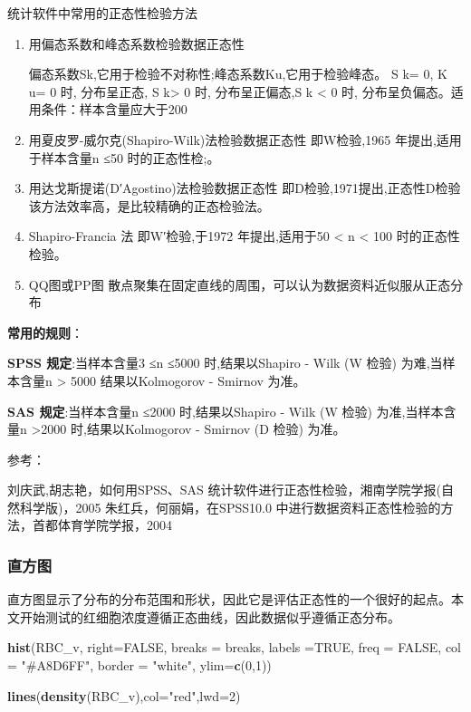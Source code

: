 \documentclass[
]{article}
\newenvironment{Shaded}{\begin{snugshade}}{\end{snugshade}}
\newcommand{\DataTypeTok}[1]{\textcolor[rgb]{0.13,0.29,0.53}{#1}}
\newcommand{\DecValTok}[1]{\textcolor[rgb]{0.00,0.00,0.81}{#1}}
\newcommand{\KeywordTok}[1]{\textcolor[rgb]{0.13,0.29,0.53}{\textbf{#1}}}
\newcommand{\NormalTok}[1]{#1}
\newcommand{\OtherTok}[1]{\textcolor[rgb]{0.56,0.35,0.01}{#1}}
\newcommand{\StringTok}[1]{\textcolor[rgb]{0.31,0.60,0.02}{#1}}
\begin{document}
统计软件中常用的正态性检验方法

\begin{enumerate}
\def\labelenumi{\arabic{enumi}.}
\item
  用偏态系数和峰态系数检验数据正态性

  偏态系数Sk,它用于检验不对称性;峰态系数Ku,它用于检验峰态。 S k= 0, K u= 0 时, 分布呈正态, S k\textgreater{} 0 时, 分布呈正偏态,S k \textless{} 0 时, 分布呈负偏态。适用条件：样本含量应大于200
\item
  用夏皮罗-威尔克(Shapiro-Wilk)法检验数据正态性
  即W检验,1965 年提出,适用于样本含量n ≤50 时的正态性检;。
\item
  用达戈斯提诺(D′Agostino)法检验数据正态性
  即D检验,1971提出,正态性D检验该方法效率高，是比较精确的正态检验法。
\item
  Shapiro-Francia 法
  即W′检验,于1972 年提出,适用于50 \textless{} n \textless{} 100 时的正态性检验。
\item
  QQ图或PP图
  散点聚集在固定直线的周围，可以认为数据资料近似服从正态分布
\end{enumerate}

\textbf{常用的规则}：

\textbf{SPSS 规定}:当样本含量3 ≤n ≤5000 时,结果以Shapiro - Wilk (W 检验) 为难,当样本含量n \textgreater{} 5000 结果以Kolmogorov - Smirnov 为准。

\textbf{SAS 规定}:当样本含量n ≤2000 时,结果以Shapiro - Wilk (W 检验) 为准,当样本含量n \textgreater2000 时,结果以Kolmogorov - Smirnov (D 检验) 为准。

参考：

刘庆武,胡志艳，如何用SPSS、SAS 统计软件进行正态性检验，湘南学院学报(自然科学版)，2005
朱红兵，何丽娟，在SPSS10.0 中进行数据资料正态性检验的方法，首都体育学院学报，2004

\hypertarget{ux76f4ux65b9ux56fe}{%
\subsubsection{直方图}\label{ux76f4ux65b9ux56fe}}

直方图显示了分布的分布范围和形状，因此它是评估正态性的一个很好的起点。本文开始测试的红细胞浓度遵循正态曲线，因此数据似乎遵循正态分布。

\begin{Shaded}
\begin{Highlighting}[]
\KeywordTok{hist}\NormalTok{(RBC_v, }\DataTypeTok{right=}\OtherTok{FALSE}\NormalTok{, }
      \DataTypeTok{breaks =}\NormalTok{ breaks, }\DataTypeTok{labels =}\OtherTok{TRUE}\NormalTok{, }
      \DataTypeTok{freq =} \OtherTok{FALSE}\NormalTok{, }\DataTypeTok{col =} \StringTok{"#A8D6FF"}\NormalTok{, }
      \DataTypeTok{border =} \StringTok{"white"}\NormalTok{, }\DataTypeTok{ylim=}\KeywordTok{c}\NormalTok{(}\DecValTok{0}\NormalTok{,}\DecValTok{1}\NormalTok{))}

\KeywordTok{lines}\NormalTok{(}\KeywordTok{density}\NormalTok{(RBC_v),}\DataTypeTok{col=}\StringTok{"red"}\NormalTok{,}\DataTypeTok{lwd=}\DecValTok{2}\NormalTok{)}
\end{Highlighting}
\end{Shaded}
\end{document}
